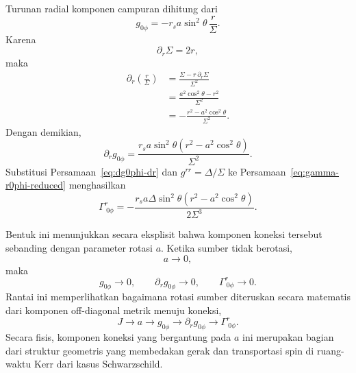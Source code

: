 Turunan radial komponen campuran dihitung dari
\begin{equation}
    g_{0\phi}
    =-r_sa\sin^2\!\theta\,\frac{r}{\Sigma}.
\end{equation}
Karena
\begin{equation}
    \partial_r\Sigma=2r,
\end{equation}
maka
\begin{equation}
\begin{split}
    \partial_r\left(\frac{r}{\Sigma}\right)
    &=\frac{\Sigma-r\,\partial_r\Sigma}{\Sigma^2}\\
    &=\frac{a^2\cos^2\!\theta-r^2}{\Sigma^2}\\
    &=-\frac{r^2-a^2\cos^2\!\theta}{\Sigma^2}.
\end{split}
    \label{eq:dr-r-over-sigma}
\end{equation}
Dengan demikian,
\begin{equation}
    \partial_r g_{0\phi}
    =\frac{r_sa\sin^2\!\theta
    \left(r^2-a^2\cos^2\!\theta\right)}{\Sigma^2}.
    \label{eq:dg0phi-dr}
\end{equation}
Substitusi Persamaan~\eqref{eq:dg0phi-dr} dan
$g^{rr}=\Delta/\Sigma$ ke
Persamaan~\eqref{eq:gamma-r0phi-reduced} menghasilkan
\begin{equation}
    \Gamma^r_{\ 0\phi}
    =-\frac{r_sa\Delta\sin^2\!\theta
    \left(r^2-a^2\cos^2\!\theta\right)}
    {2\Sigma^3}.
    \label{eq:gamma-r0phi-result}
\end{equation}

Bentuk ini menunjukkan secara eksplisit bahwa komponen koneksi tersebut
sebanding dengan parameter rotasi $a$. Ketika sumber tidak berotasi,
\begin{equation}
    a\rightarrow0,
\end{equation}
maka
\begin{equation}
    g_{0\phi}\rightarrow0,
    \qquad
    \partial_r g_{0\phi}\rightarrow0,
    \qquad
    \Gamma^r_{\ 0\phi}\rightarrow0.
    \label{eq:gamma-r0phi-limit}
\end{equation}
Rantai ini memperlihatkan bagaimana rotasi sumber diteruskan secara
matematis dari komponen off-diagonal metrik menuju koneksi,
\begin{equation}
    J
    \longrightarrow
    a
    \longrightarrow
    g_{0\phi}
    \longrightarrow
    \partial_r g_{0\phi}
    \longrightarrow
    \Gamma^r_{\ 0\phi}.
    \label{eq:rotation-connection-chain}
\end{equation}
Secara fisis, komponen koneksi yang bergantung pada $a$ ini merupakan
bagian dari struktur geometris yang membedakan gerak dan transportasi spin
di ruang-waktu Kerr dari kasus Schwarzschild.

